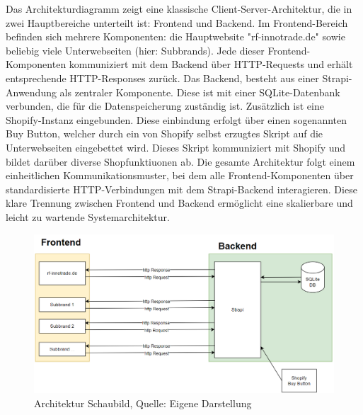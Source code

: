 Das Architekturdiagramm zeigt eine klassische Client-Server-Architektur, die in zwei Hauptbereiche unterteilt ist: Frontend und Backend. 
Im Frontend-Bereich befinden sich mehrere Komponenten: die Hauptwebsite "rf-innotrade.de" sowie beliebig viele Unterwebseiten (hier: Subbrands). Jede dieser Frontend-Komponenten kommuniziert mit dem Backend über HTTP-Requests und erhält entsprechende HTTP-Responses zurück. 
Das Backend, besteht aus einer Strapi-Anwendung als zentraler Komponente. Diese ist mit einer SQLite-Datenbank verbunden, die für die Datenspeicherung zuständig ist. Zusätzlich ist eine Shopify-Instanz eingebunden. Diese einbindung erfolgt über einen sogenannten Buy Button, welcher durch ein von Shopify selbst erzugtes Skript auf die Unterwebseiten eingebettet wird. Dieses Skript kommuniziert mit Shopify und bildet darüber diverse Shopfunktiuonen ab.
Die gesamte Architektur folgt einem einheitlichen Kommunikationsmuster, bei dem alle Frontend-Komponenten über standardisierte HTTP-Verbindungen mit dem Strapi-Backend interagieren. Diese klare Trennung zwischen Frontend und Backend ermöglicht eine skalierbare und leicht zu wartende Systemarchitektur.

\begin{figure}[H]
    \centering
    \includegraphics[width=1\textwidth]{figures/architektur.png}
    \caption{Architektur Schaubild, Quelle: Eigene Darstellung}
	\label{fig:architekturSchaubild}
\end{figure}